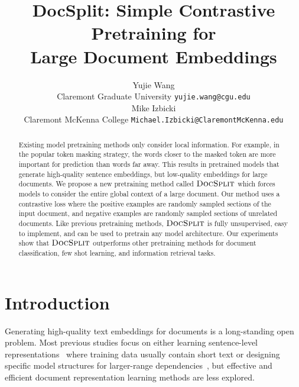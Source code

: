 \documentclass[11pt]{article}
\title{DocSplit: Simple Contrastive Pretraining for \\ Large Document Embeddings}
\author{Yujie Wang \\
  Claremont Graduate University 
  \texttt{yujie.wang@cgu.edu} \\\And
  Mike Izbicki \\
  Claremont McKenna College
  \texttt{Michael.Izbicki@ClaremontMcKenna.edu} \\}
\newcommand{\our}{\mbox{\textsc{DocSplit}}}
\begin{document}
\maketitle
\begin{abstract}

Existing model pretraining methods only consider local information.
For example, in the popular token masking strategy, the words closer to the masked token are more important for prediction than words far away.
This results in pretrained models that generate high-quality sentence embeddings, but low-quality embeddings for large documents.
We propose a new pretraining method called $\our$ which forces models to consider the entire global context of a large document.
Our method uses a contrastive loss where the positive examples are randomly sampled sections of the input document, and negative examples are randomly sampled sections of unrelated documents.
Like previous pretraining methods, $\our$ is fully unsupervised, easy to implement, and can be used to pretrain any model
architecture.
Our experiments show that $\our$ outperforms other pretraining methods for document classification, few shot learning, and information retrieval tasks.
\end{abstract}



\section{Introduction}


Generating high-quality text embeddings for documents is a long-standing open problem.
Most previous studies focus on either learning sentence-level representations~\cite{Hill2016LearningDR, Logeswaran2018AnEF, Gao2021SimCSESC} where training data usually contain short text or designing specific model structures for larger-range dependencies~\cite{Beltagy2020LongformerTL, Zaheer2020BigBT},
but effective and efficient document representation learning methods are less explored.
\end{document}

